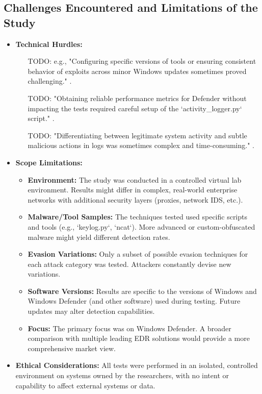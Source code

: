 \documentclass[11pt]{article}
\begin{document}
	\subsection{Challenges Encountered and Limitations of the Study}
	\begin{itemize}
		\item \textbf{Technical Hurdles:}
		\begin{itemize}
			\item [TODO: e.g., "Configuring specific versions of tools or ensuring consistent behavior of exploits across minor Windows updates sometimes proved challenging."].
			\item [TODO: "Obtaining reliable performance metrics for Defender without impacting the tests required careful setup of the `activity_logger.py` script."].
			\item [TODO: "Differentiating between legitimate system activity and subtle malicious actions in logs was sometimes complex and time-consuming."].
		\end{itemize}
		\item \textbf{Scope Limitations:}
		\begin{itemize}
			\item \textbf{Environment:} The study was conducted in a controlled virtual lab environment. Results might differ in complex, real-world enterprise networks with additional security layers (proxies, network IDS, etc.).
			\item \textbf{Malware/Tool Samples:} The techniques tested used specific scripts and tools (e.g., `keylog.py`, `ncat`). More advanced or custom-obfuscated malware might yield different detection rates.
			\item \textbf{Evasion Variations:} Only a subset of possible evasion techniques for each attack category was tested. Attackers constantly devise new variations.
			\item \textbf{Software Versions:} Results are specific to the versions of Windows and Windows Defender (and other software) used during testing. Future updates may alter detection capabilities.
			\item \textbf{Focus:} The primary focus was on Windows Defender. A broader comparison with multiple leading EDR solutions would provide a more comprehensive market view.
		\end{itemize}
		\item \textbf{Ethical Considerations:} All tests were performed in an isolated, controlled environment on systems owned by the researchers, with no intent or capability to affect external systems or data.
	\end{itemize}
	
\end{document}
